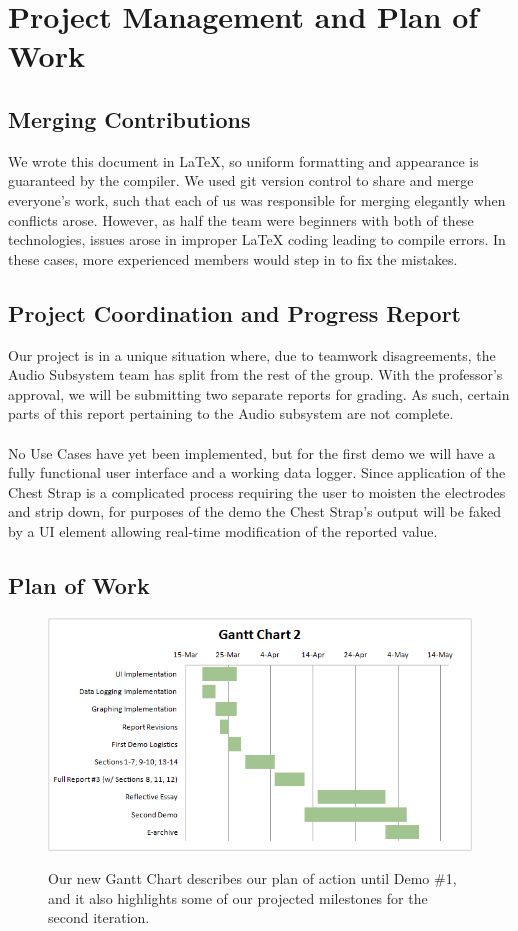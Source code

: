 \documentclass[letterpaper,english, 12pt]{scrreprt}
\begin{document}
\chapter{Project Management and Plan of Work}
\section{Merging Contributions}
We wrote this document in \LaTeX, so uniform formatting and appearance is guaranteed by the compiler.
We used git version control to share and merge everyone's work, such that each of us was responsible for merging elegantly when conflicts arose.
However, as half the team were beginners with both of these technologies, issues arose in improper LaTeX coding leading to compile errors.
In these cases, more experienced members would step in to fix the mistakes.

\section{Project Coordination and Progress Report}
Our project is in a unique situation where, due to teamwork disagreements, the Audio Subsystem team has split from the rest of the group.
With the professor's approval, we will be submitting two separate reports for grading.
As such, certain parts of this report pertaining to the Audio subsystem are not complete.
\\
\\
No Use Cases have yet been implemented, but for the first demo we will have a fully functional user interface and a working data logger.
Since application of the Chest Strap is a complicated process requiring the user to moisten the electrodes and strip down, for purposes of the demo the Chest Strap's output will be faked by a UI element allowing real-time modification of the reported value.

\section{Plan of Work}
\begin{figure}[H]
	\centering
	\includegraphics{img/Gantt_Chart2.png}\\
	\caption{Our new Gantt Chart describes our plan of action until Demo \#1, and it also highlights some of our projected milestones for the second iteration.} 
\end{figure}
\end{document}
